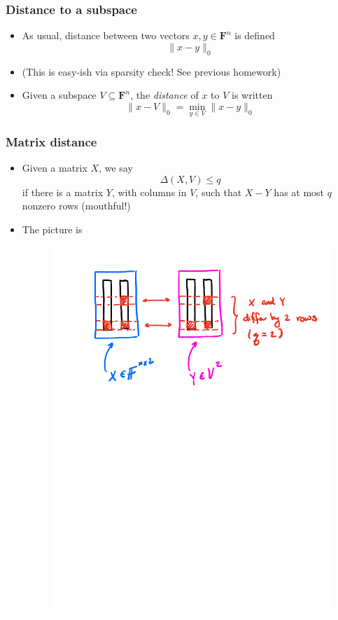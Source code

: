 \documentclass{beamer}
\newcommand{\field}{\mathbf{F}}
\begin{document}
    \begin{frame}
        \frametitle{Distance to a subspace}
        \begin{itemize}\itemsep=12pt
            \item As usual, distance between two vectors $x, y \in \field^n$ is defined
            \[
                \|x - y\|_0
            \]
            \item (This is easy-ish via sparsity check! See previous homework)
            \pause
            \item Given a subspace $V\subseteq \field^n$, the \emph{distance} of $x$ to $V$ is
                written
            \[
                \|x - V\|_0 = \min_{y \in V} \|x - y\|_0
            \]
        \end{itemize}
	\end{frame}

    \begin{frame}
        \frametitle{Matrix distance}
        \begin{itemize}\itemsep=12pt
            \item Given a matrix $X$, we say
            \[
                \Delta(X, V) \le q
            \]
            if there is a matrix $Y$, with columns in $V$, such that $X - Y$ has at most $q$ nonzero rows (mouthful!)
            \pause
            \item The picture is
            \begin{figure}
                \centering
                \includegraphics[clip, trim=0 7in 0 .5in, width=.8\textwidth]{figures/mat-distance.pdf}
            \end{figure}
        \end{itemize}
	\end{frame}
\end{document}
